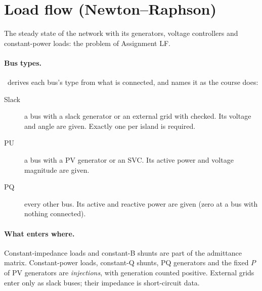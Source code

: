 \section{Load flow (Newton--Raphson)}\label{sec:study-loadflow}

The steady state of the network with its generators, voltage controllers and
constant-power loads: the problem of Assignment LF.



\paragraph{Bus types.} \app\ derives each bus's type from what is connected, and names
it as the course does:
\begin{description}
  \item[Slack] a bus with a slack generator or an external grid with  checked.
    Its voltage and angle are given. Exactly one per island is required.
  \item[PU] a bus with a PV generator or an SVC. Its active power and voltage magnitude
    are given.
  \item[PQ] every other bus. Its active and reactive power are given (zero at a bus with
    nothing connected).
\end{description}

\paragraph{What enters where.} Constant-impedance loads and constant-B shunts are part of
the admittance matrix. Constant-power loads, constant-Q shunts, PQ generators and the
fixed $P$ of PV generators are \emph{injections}, with generation counted positive.
External grids enter only as slack buses; their impedance is short-circuit data.

